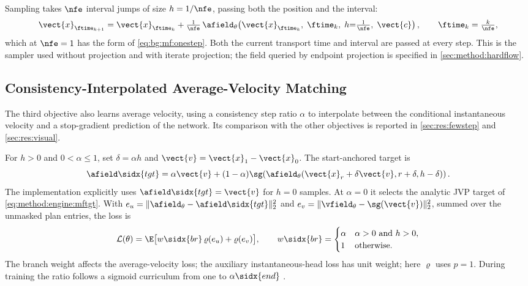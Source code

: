 Sampling takes $\nfe$ interval jumps of size $h=1/\nfe$, passing both the position and the
interval:
\begin{equation}\label{eq:method:engine:mfsample}
  \vect{x}_{\ftime_{k+1}} = \vect{x}_{\ftime_{k}}
    + \tfrac{1}{\nfe}\,\afield_{\theta}\!\left(\vect{x}_{\ftime_{k}},\;\ftime_{k},\;h{=}\tfrac{1}{\nfe},\;\vect{c}\right),
  \qquad \ftime_{k} = \tfrac{k}{\nfe},
\end{equation}
which at $\nfe=1$ has the form of \eqref{eq:bg:mf:onestep}. Both the current transport time
and interval are passed at every step. This is the sampler used without projection and with iterate
projection; the field queried by endpoint projection is specified in \autoref{sec:method:hardflow}.

\subsection{Consistency-Interpolated Average-Velocity Matching}\label{sec:method:alphaflow}

The third objective \parencite{zhang2025alphaflow} also learns average velocity, using a consistency
step ratio $\alpha$ to interpolate between the conditional instantaneous velocity and a
stop-gradient prediction of the network. Its comparison with the other objectives is reported in
\autoref{sec:res:fewstep} and \autoref{sec:res:visual}.

For $h>0$ and $0<\alpha\le1$, set $\delta=\alpha h$ and
$\vect{v}=\vect{x}_{1}-\vect{x}_{0}$. The start-anchored target is
\begin{equation}\label{eq:method:engine:aftgt}
  \afield\sidx{tgt}
  =\alpha\vect{v}+(1-\alpha)\sg\!\left(
    \afield_{\theta}(\vect{x}_{r}+\delta\vect{v},r+\delta,h-\delta)\right).
\end{equation}
The implementation explicitly uses $\afield\sidx{tgt}=\vect{v}$ for $h=0$ samples. At
$\alpha=0$ it selects the analytic JVP target of \eqref{eq:method:engine:mftgt}.
With $e_u=\|\afield_{\theta}-\afield\sidx{tgt}\|_2^2$ and
$e_v=\|\vfield_{\theta}-\sg(\vect{v})\|_2^2$, summed over the unmasked plan entries, the loss is
\begin{equation}\label{eq:method:engine:afloss}
  \mathcal{L}(\theta)=\E\big[w\sidx{br}\,\varrho(e_u)+\varrho(e_v)\big],
  \qquad
  w\sidx{br}=\begin{cases}
    \alpha & \alpha>0\text{ and }h>0,\\
    1 & \text{otherwise}.
  \end{cases}
\end{equation}
The branch weight affects the average-velocity loss; the auxiliary instantaneous-head loss has
unit weight; here $\varrho$ uses $p=1$. During training the ratio follows a sigmoid curriculum from one to
$\alpha\sidx{end}$ \parencite[Alg.~2]{zhang2025alphaflow}.

